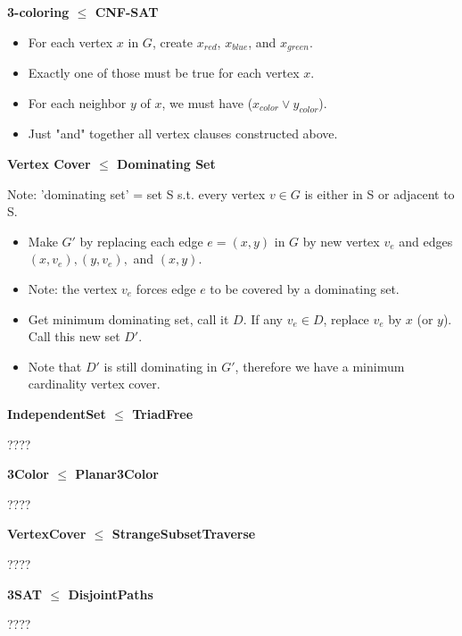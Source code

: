 \documentclass[12pt]{article}
\providecommand{\reducible}[2]{
  \textbf{#1} $\leq$ \textbf{#2}
}
\begin{document}
\begin{centering}\textbf{\reducible{3-coloring}{CNF-SAT}}\par\end{centering}
\begin{itemize}
  \item For each vertex $x$ in $G$, create $x_{red}$, $x_{blue}$, and $x_{green}$.
  \item Exactly one of those must be true for each vertex $x$.
  \item For each neighbor $y$ of $x$, we must have ($x_{color} \lor y_{color}$).
  \item Just "and" together all vertex clauses constructed above.
\end{itemize}

\begin{centering}\textbf{\reducible{Vertex Cover}{Dominating Set}}\par\end{centering}
Note: 'dominating set' = set S s.t. every vertex $v \in G$ is either in S or adjacent to S.
\begin{itemize}
  \item Make $G'$ by replacing each edge $e = (x,y)$ in $G$ by new vertex $v_e$ and edges $(x,v_e),(y,v_e),$ and $(x,y)$.
  \item Note: the vertex $v_e$ forces edge $e$ to be covered by a dominating set.
  \item Get minimum dominating set, call it $D$. If any $v_e \in D$, replace $v_e$ by $x$ (or $y$). Call this new set $D'$.
  \item Note that $D'$ is still dominating in $G'$, therefore we have a minimum cardinality vertex cover.
\end{itemize}


\begin{centering}\textbf{\reducible{IndependentSet}{TriadFree}}\par\end{centering}
????


\begin{centering}\textbf{\reducible{3Color}{Planar3Color}}\par\end{centering}
????


\begin{centering}\textbf{\reducible{VertexCover}{StrangeSubsetTraverse}}\par\end{centering}
????


\begin{centering}\textbf{\reducible{3SAT}{DisjointPaths}}\par\end{centering}
????
\end{document}
